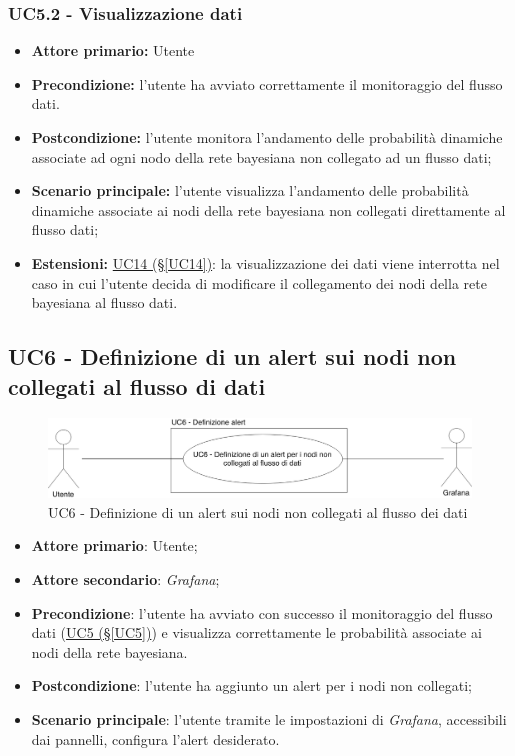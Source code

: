 \subsubsection{UC5.2 - Visualizzazione dati}\label{UC5.2}
\begin{itemize}
\item \textbf{Attore primario:} Utente
\item \textbf{Precondizione:} l'utente ha avviato correttamente il monitoraggio del flusso dati.
\item \textbf{Postcondizione:} l'utente monitora l'andamento delle probabilità dinamiche associate ad ogni nodo della rete bayesiana non collegato ad un flusso dati;
\item \textbf{Scenario principale:} l'utente visualizza l'andamento delle probabilità dinamiche associate ai nodi 			della rete bayesiana non collegati direttamente al flusso dati;
\item \textbf{Estensioni:} \hyperref[UC14]{UC14 (§\ref*{UC14})}: la visualizzazione dei dati viene interrotta nel 			caso in cui l'utente decida di modificare il collegamento dei nodi della rete bayesiana al flusso dati.
\end{itemize}

\newpage

\subsection{UC6 - Definizione di un alert sui nodi non collegati al flusso di dati}\label{UC6}

\begin{figure}[H]
	\centering
	\includegraphics[scale=0.3]{./images/UC6.png}
	\caption{UC6 - Definizione di un alert sui nodi non collegati al flusso dei dati}
\end{figure}

\begin{itemize}
	\item \textbf{Attore primario}: Utente;
	\item \textbf{Attore secondario}: \textit{Grafana};
	\item \textbf{Precondizione}: l'utente ha avviato con successo il monitoraggio del flusso dati (\hyperref[UC5]					{UC5 (§\ref*{UC5})}) e visualizza correttamente le probabilità associate ai nodi della rete bayesiana.
	\item \textbf{Postcondizione}: l'utente ha aggiunto un alert per i nodi non collegati;
	\item \textbf{Scenario principale}: l'utente tramite le impostazioni di \textit{Grafana}, accessibili dai pannelli, configura l'alert desiderato.
\end{itemize}

